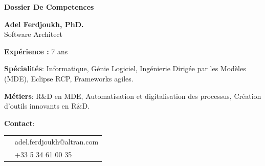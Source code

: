 \thispagestyle{empty}

\renewcommand\refname{~}

\begin{center}
\par\textbf{\huge \sc Dossier De Competences}
\end{center}

\vspace{.5cm}

\begin{minipage}{0.45\textwidth}
\textbf{Adel Ferdjoukh, PhD.} \\ 
Software Architect

\vspace{.3cm}


\textbf{Expérience :} 7 ans 

\medskip
{\bf Spécialités}: Informatique, Génie Logiciel, Ingénierie Dirigée par les Modèles (MDE), Eclipse RCP, Frameworks agiles.

\medskip
{\bf Métiers}: R\&D en MDE, Automatisation et digitalisation des processus, Création d’outils innovants en R\&D.

\medskip
{\bf Contact}:

\medskip

\begin{tabular}{cl}
\email{} & adel.ferdjoukh@altran.com\\
\phone{} & +33 5 34 61 00 35\\
\end{tabular}



\end{minipage}
\hfill
